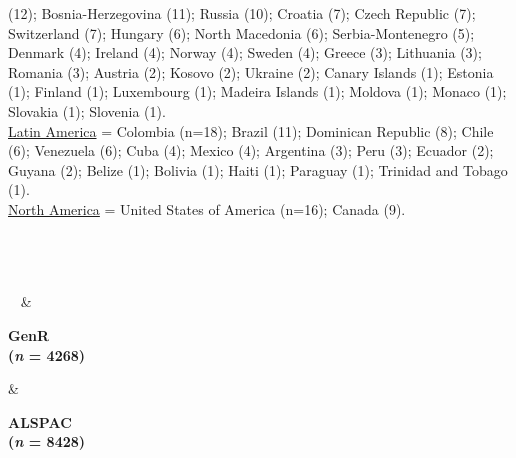 \documentclass[
  letterpaper,
  DIV=11,
  numbers=noendperiod]{scrreport}
\begin{document}
\begin{longtable}[]
{\begin{minipage}[t]{\linewidth}
{(12); Bosnia-Herzegovina (11); Russia (10); Croatia (7); Czech Republic
(7); Switzerland (7); Hungary (6); North Macedonia (6);
Serbia-Montenegro (5); Denmark (4); Ireland (4); Norway (4); Sweden (4);
Greece (3); Lithuania (3); Romania (3); Austria (2); Kosovo (2); Ukraine
(2); Canary Islands (1); Estonia (1); Finland (1); Luxembourg (1);
Madeira Islands (1); Moldova (1); Monaco (1); Slovakia (1); Slovenia
(1).\\
\ul{Latin America} = Colombia (n=18); Brazil (11); Dominican Republic
(8); Chile (6); Venezuela (6); Cuba (4); Mexico (4); Argentina (3); Peru
(3); Ecuador (2); Guyana (2); Belize (1); Bolivia (1); Haiti (1);
Paraguay (1); Trinidad and Tobago (1).\\
\ul{North America} = United States of America (n=16); Canada (9).}\strut
\end{minipage}} \\
 \\
 \\
\bottomrule\noalign{}
\endlastfoot
\textbf{~} & \begin{minipage}[t]{\linewidth}\raggedright
\textbf{GenR\\
(\emph{n} = 4268)}\strut
\end{minipage} & \begin{minipage}[t]{\linewidth}\raggedright
\textbf{ALSPAC\\
(\emph{n} = 8428)}\strut
\end{minipage} \\
 \\

\end{longtable}
\end{document}
